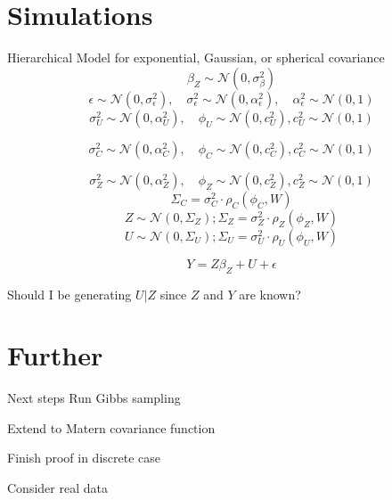 \documentclass[10 pt]{beamer}
\begin{document}
\section{Simulations}

\begin{frame}{Hierarchical Model for exponential, Gaussian, or spherical covariance}
\[\beta_Z \sim \mathcal{N}(0,\sigma_\beta^2)\]
\[\epsilon \sim \mathcal{N}(0,\sigma^2_\epsilon), \quad \sigma^2_\epsilon \sim \mathcal{N}(0, \alpha_\epsilon^2),\quad \alpha_\epsilon^2 \sim \mathcal{N}(0,1)\]
\[\sigma_U^2 \sim \mathcal{N}(0, \alpha_U^2), \quad \phi_U \sim \mathcal{N}(0, c_U^2), c_U^2 \sim \mathcal{N}(0,1)\]

\[\sigma_C^2 \sim \mathcal{N}(0, \alpha_C^2), \quad \phi_C \sim \mathcal{N}(0, c_C^2), c_C^2 \sim \mathcal{N}(0,1)\]

\[\sigma_Z^2 \sim \mathcal{N}(0, \alpha_Z^2), \quad \phi_Z \sim \mathcal{N}(0, c_Z^2), c_Z^2 \sim \mathcal{N}(0,1)\]
\[\Sigma_C = \sigma^2_C \cdot \rho_C(\phi_C,W)\]
\[Z \sim \mathcal{N}(0, \Sigma_Z); \Sigma_Z = \sigma^2_Z \cdot \rho_Z(\phi_Z,W)\]
\[U \sim \mathcal{N}(0, \Sigma_U); \Sigma_U = \sigma^2_U\cdot \rho_U(\phi_U,W)\] 

\[Y = Z\beta_Z + U + \epsilon\]

Should I be generating $U|Z$ since $Z$ and $Y$ are known?



\end{frame}

\section{Further}
\begin{frame}{Next steps}
Run Gibbs sampling 
\bigskip

Extend to Matern covariance function
\bigskip

Finish proof in discrete case
\bigskip

Consider real data
\end{frame}
\end{document}
